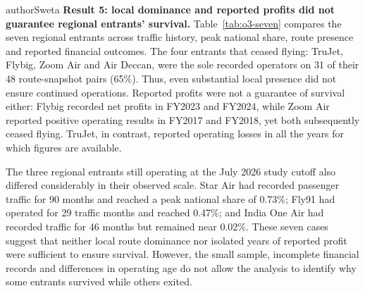 \begin{mergedcontribution}{authorSweta}
\textbf{Result 5: local dominance and reported profits did not guarantee regional entrants' survival.} Table~\ref{tab:o3-seven} compares the seven regional entrants across traffic history, peak national share, route presence and reported financial outcomes. The four entrants that ceased flying: TruJet, Flybig, Zoom Air and Air Deccan, were the sole recorded operators on 31 of their 48 route-snapshot pairs (65\%). Thus, even substantial local presence did not ensure continued operations. Reported profits were not a guarantee of survival either: Flybig recorded net profits in FY2023 and FY2024, while Zoom Air reported positive operating results in FY2017 and FY2018, yet both subsequently ceased flying. TruJet, in contrast, reported operating losses in all the years for which figures are available.

The three regional entrants still operating at the July 2026 study cutoff also differed considerably in their observed scale. Star Air had recorded passenger traffic for 90 months and reached a peak national share of 0.73\%; Fly91 had operated for 29 traffic months and reached 0.47\%; and India One Air had recorded traffic for 46 months but remained near 0.02\%. These seven cases suggest that neither local route dominance nor isolated years of reported profit were sufficient to ensure survival. However, the small sample, incomplete financial records and differences in operating age do not allow the analysis to identify why some entrants survived while others exited.


\end{mergedcontribution}
